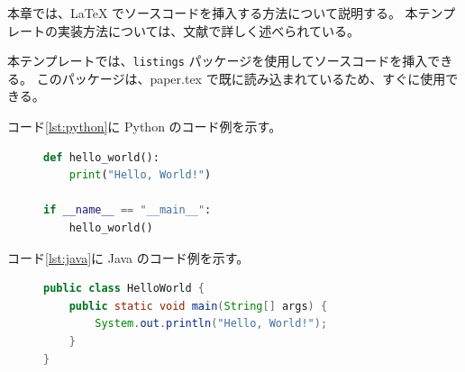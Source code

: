 
\iffalse
本章では、LaTeX でソースコードを挿入する方法について説明する。
本テンプレートの実装方法については、文献\cite{kimura-automation}で詳しく述べられている。


本テンプレートでは、\verb|listings| パッケージを使用してソースコードを挿入できる。
このパッケージは、paper.tex で既に読み込まれているため、すぐに使用できる。



コード\ref{lst:python}に Python のコード例を示す。

\begin{figure}[tp]
\begin{lstlisting}[caption={Python のコード例}, label={lst:python}, language=Python]
def hello_world():
    print("Hello, World!")

if __name__ == "__main__":
    hello_world()
\end{lstlisting}
\end{figure}


コード\ref{lst:java}に Java のコード例を示す。

\begin{figure}[tp]
\begin{lstlisting}[caption={Java のコード例}, label={lst:java}, language=Java]
public class HelloWorld {
    public static void main(String[] args) {
        System.out.println("Hello, World!");
    }
}
\end{lstlisting}
\end{figure}

